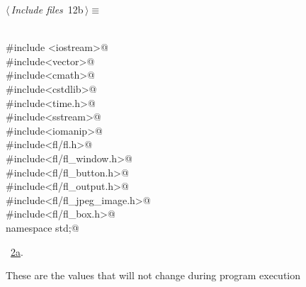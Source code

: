 \documentclass{article}
\renewcommand{\NWtarget}[2]{\hypertarget{#1}{#2}}
\renewcommand{\NWlink}[2]{\hyperlink{#1}{#2}}
\begin{document}
\begin{flushleft} \small
\begin{minipage}{\linewidth}\label{scrap18}\raggedright\small
\NWtarget{nuweb12b}{} $\langle\,${\it Include files}\nobreak\ {\footnotesize {12b}}$\,\rangle\equiv$
\vspace{-1ex}
\begin{list}{}{} \item
\mbox{}\verb@@\\
\mbox{}\verb@#include <iostream>@\\
\mbox{}\verb@#include<vector>@\\
\mbox{}\verb@#include<cmath>@\\
\mbox{}\verb@#include<cstdlib>@\\
\mbox{}\verb@#include<time.h>@\\
\mbox{}\verb@#include<sstream>@\\
\mbox{}\verb@#include<iomanip>@\\
\mbox{}\verb@#include<fl/fl.h>@\\
\mbox{}\verb@#include<fl/fl_window.h>@\\
\mbox{}\verb@#include<fl/fl_button.h>@\\
\mbox{}\verb@#include<fl/fl_output.h>@\\
\mbox{}\verb@#include<fl/fl_jpeg_image.h>@\\
\mbox{}\verb@#include<fl/fl_box.h>@\\
\mbox{}\verb@using namespace std;@\\
\mbox{}\verb@@{\NWsep}
\end{list}
\vspace{-1.5ex}
\footnotesize
\begin{list}{}{\setlength{\itemsep}{-\parsep}\setlength{\itemindent}{-\leftmargin}}
\item \NWtxtMacroRefIn\ \NWlink{nuweb2a}{2a}.

\item{}
\end{list}
\end{minipage}\vspace{4ex}
\end{flushleft}
These are the values that will not change during program execution
\end{document}
